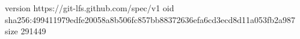 version https://git-lfs.github.com/spec/v1
oid sha256:499411979edfe20058a8b506fc857bb88372636efa6cd3ecd8d11a053fb2a987
size 291449

